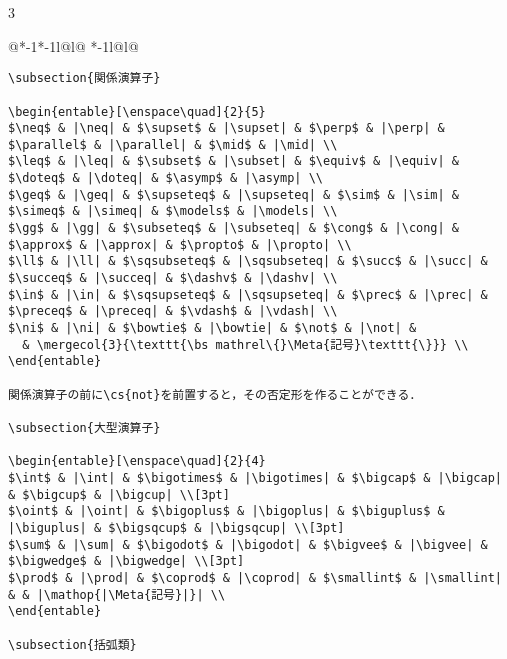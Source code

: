 \documentclass[10pt,a4paper,landscape,dvipdfmx]{jarticle}
\makeatletter
\def\set@etsep#1#2{\def\etcolsep{#1}\def\etitemsep{#2}}
\newenvironment{entable}[3][\quad\qquad]{%
  \set@etsep#1\relax\relax
  \begin{tabular}{%
    @{}*{\the\numexpr#3-1}{*{\the\numexpr#2-1}{l@{\etcolsep}}l@{\etitemsep}}%
    *{\the\numexpr#2-1}{l@{\etcolsep}}l@{}}}{%
  \end{tabular}}
\newcommand{\mergecol}[2]{\multicolumn{#1}{@{}l@{}}{#2}}
\newcommand*\eghostguarded{%
  \ifmmode \expandafter\@firstofone
  \else \expandafter\pxqgg@eghostguarded@a
  \fi}
\def\pxqgg@eghostguarded@a#1{%
  {\pxqgg@TI\pxqgg@cwm}%
  #1%
  {\pxqgg@TI\pxqgg@cwm}}
\newcommand{\codefont}{\ttfamily\gtfamily}
\newcommand{\cs}[1]{\eghostguarded{{\codefont \bs #1}}}
\newcommand{\Meta}[1]{$\langle$\mbox{}\emph{#1}\mbox{}$\rangle$}
\makeatother
\begin{document}
\begin{multicols}{3}
\begin{entable}[\enspace]{2}{1}
\begin{verbatim}
\subsection{関係演算子}

\begin{entable}[\enspace\quad]{2}{5}
$\neq$ & |\neq| & $\supset$ & |\supset| & $\perp$ & |\perp| & $\parallel$ & |\parallel| & $\mid$ & |\mid| \\
$\leq$ & |\leq| & $\subset$ & |\subset| & $\equiv$ & |\equiv| & $\doteq$ & |\doteq| & $\asymp$ & |\asymp| \\
$\geq$ & |\geq| & $\supseteq$ & |\supseteq| & $\sim$ & |\sim| & $\simeq$ & |\simeq| & $\models$ & |\models| \\
$\gg$ & |\gg| & $\subseteq$ & |\subseteq| & $\cong$ & |\cong| & $\approx$ & |\approx| & $\propto$ & |\propto| \\
$\ll$ & |\ll| & $\sqsubseteq$ & |\sqsubseteq| & $\succ$ & |\succ| & $\succeq$ & |\succeq| & $\dashv$ & |\dashv| \\
$\in$ & |\in| & $\sqsupseteq$ & |\sqsupseteq| & $\prec$ & |\prec| & $\preceq$ & |\preceq| & $\vdash$ & |\vdash| \\
$\ni$ & |\ni| & $\bowtie$ & |\bowtie| & $\not$ & |\not| &
  & \mergecol{3}{\texttt{\bs mathrel\{}\Meta{記号}\texttt{\}}} \\
\end{entable}

関係演算子の前に\cs{not}を前置すると，その否定形を作ることができる．

\subsection{大型演算子}

\begin{entable}[\enspace\quad]{2}{4}
$\int$ & |\int| & $\bigotimes$ & |\bigotimes| & $\bigcap$ & |\bigcap| & $\bigcup$ & |\bigcup| \\[3pt]
$\oint$ & |\oint| & $\bigoplus$ & |\bigoplus| & $\biguplus$ & |\biguplus| & $\bigsqcup$ & |\bigsqcup| \\[3pt]
$\sum$ & |\sum| & $\bigodot$ & |\bigodot| & $\bigvee$ & |\bigvee| & $\bigwedge$ & |\bigwedge| \\[3pt]
$\prod$ & |\prod| & $\coprod$ & |\coprod| & $\smallint$ & |\smallint| & & |\mathop{|\Meta{記号}|}| \\
\end{entable}

\subsection{括弧類}


\end{verbatim}
\end{entable}
\end{multicols}
\end{document}

